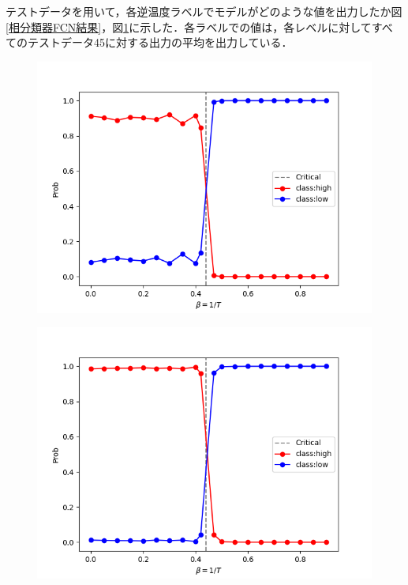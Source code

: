 \documentclass[a4paper,11pt]{jsreport}
\begin{document}
テストデータを用いて，各逆温度ラベルでモデルがどのような値を出力したか図\ref{相分類器FCN結果}，図\ref{相分類器CNN結果}に示した．各ラベルでの値は，各レベルに対してすべてのテストデータ45に対する出力の平均を出力している．
\begin{figure}[H]
  \begin{minipage}[b]{0.45\linewidth}
    \begin{center}
      \includegraphics[keepaspectratio, scale=0.4]{image/plot_square_FCNN.png}
      \label{相分類器FCN結果}
    \end{center}
  \end{minipage}
  \begin{minipage}[b]{0.45\linewidth}
    \begin{center}
      \includegraphics[keepaspectratio, scale=0.4]{image/plot_square_CNN.png}
      \label{相分類器CNN結果}
    \end{center}
  \end{minipage}
\end{figure}
\end{document}
